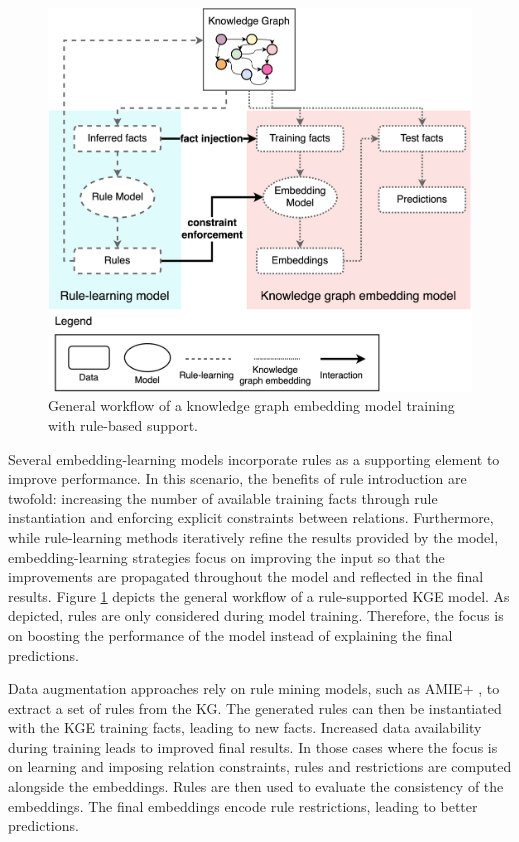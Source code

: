 \begin{figure}[t]
    \centering
    \includegraphics[width=.7\linewidth]{6_kbsextractiondl/figures/rule_support_training.eps}
    \caption{General workflow of a knowledge graph embedding model training with rule-based support.}
    \label{fig:rule_training}
\end{figure}

Several embedding-learning models incorporate rules as a supporting element to improve performance. In this scenario, the benefits of rule introduction are twofold: increasing the number of available training facts through rule instantiation and enforcing explicit constraints between relations. Furthermore, while rule-learning methods iteratively refine the results provided by the model, embedding-learning strategies focus on improving the input so that the improvements are propagated throughout the model and reflected in the final results. Figure \ref{fig:rule_training} depicts the general workflow of a rule-supported KGE model. As depicted, rules are only considered during model training. Therefore, the focus is on boosting the performance of the model instead of explaining the final predictions.

Data augmentation approaches rely on rule mining models, such as AMIE+ \citep{amie+}, to extract a set of rules from the KG. The generated rules can then be instantiated with the KGE training facts, leading to new facts. Increased data availability during training leads to improved final results. In those cases where the focus is on learning and imposing relation constraints, rules and restrictions are computed alongside the embeddings. Rules are then used to evaluate the consistency of the embeddings. The final embeddings encode rule restrictions, leading to better predictions.

